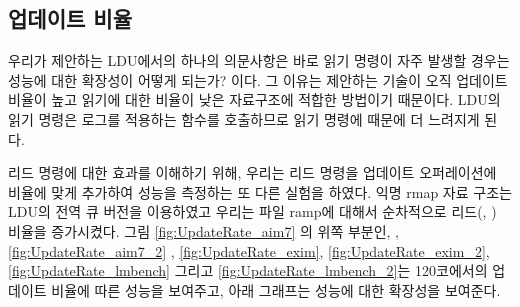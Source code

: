 \subsection{업데이트 비율}

우리가 제안하는 LDU에서의 하나의 의문사항은 바로 읽기 명령이 자주 발생할 경우는 성능에 대한 확장성이 
어떻게 되는가? 이다.
그 이유는 제안하는 기술이 오직 업데이트 비율이 높고 읽기에 대한 비율이 낮은 자료구조에 적합한 방법이기 때문이다. 
LDU의 읽기 명령은 로그를 적용하는  함수를 호출하므로 읽기 명령에 때문에 
더 느려지게 된다. 

리드 명령에 대한 효과를 이해하기 위해, 우리는 리드 명령을 업데이트 오퍼레이션에 비율에 맞게 추가하여
성능을 측정하는 또 다른 실험을 하였다. 
익명 rmap 자료 구조는 LDU의 전역 큐 버전을 이용하였고 우리는 파일 ramp에 대해서
 순차적으로 리드(, ) 비율을 증가시켰다.
그림 \ref{fig:UpdateRate_aim7} 의 위쪽 부분인, 
,\ref{fig:UpdateRate_aim7_2} ,  \ref{fig:UpdateRate_exim}, 
\ref{fig:UpdateRate_exim_2},  \ref{fig:UpdateRate_lmbench} 그리고
\ref{fig:UpdateRate_lmbench_2}는 120코에서의 업데이트 비율에 따른 성능을 보여주고,
 아래 그래프는 성능에 대한 확장성을 보여준다.
 
